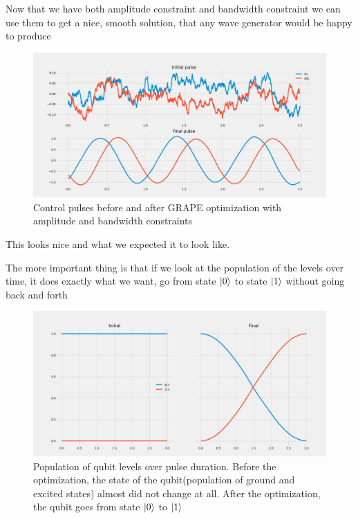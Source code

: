 \documentclass[english, a4paper, 12pt, twoside]{article}
\numberwithin{equation}{section} %
\begin{document}
Now that we have both amplitude constraint and bandwidth constraint we can use them to get a nice, smooth solution, that any wave generator would be happy to produce
\begin{figure}[H]
    \centering
    \includegraphics[width=1\columnwidth]{Results/qubit-band-amp-const/pulses.png}
    \caption{Control pulses before and after GRAPE optimization with amplitude and bandwidth constraints}
    \label{fig:band-amp-const-qubit}
\end{figure}
This looks nice and what we expected it to look like.

The more important thing is that if we look at the population of the levels over time, it does exactly what we want, go from state $\ket{0}$ to state $\ket{1}$ without going back and forth
\begin{figure}[H]
    \centering
    \includegraphics[width=1\columnwidth]{Results/qubit-band-amp-const/level-population.png}
    \caption{Population of qubit levels over pulse duration. Before the optimization, the state of the qubit(population of ground and excited states) almost did not change at all. After the optimization, the qubit goes from state $\ket{0}$ to $\ket{1}$}
    \label{fig:band-amp-const-level-population}
\end{figure}
\end{document}
